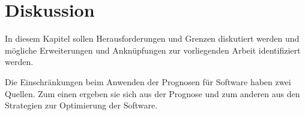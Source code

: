 
%
%

%
%



\chapter{Diskussion}\label{CAP:discussion}
\noindent In diesem Kapitel sollen Herausforderungen und Grenzen diskutiert werden und mögliche Erweiterungen und Anknüpfungen zur vorliegenden Arbeit identifiziert werden.

Die Einschränkungen beim Anwenden der Prognosen für Software haben zwei Quellen.
Zum einen ergeben sie sich aus der Prognose und zum anderen aus den Strategien zur Optimierung der Software.

